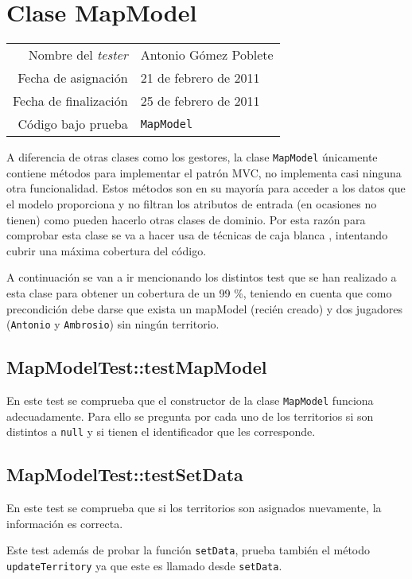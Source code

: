 \section{Clase MapModel}

{\small
\begin{tabular}{r|l}
Nombre del \textit{tester} & Antonio Gómez Poblete \\
Fecha de asignación & 21 de febrero de 2011 \\
Fecha de finalización & 25 de febrero de 2011 \\
Código bajo prueba & \texttt{MapModel}
\end{tabular}
}

A diferencia de otras clases como los gestores, la clase \texttt{MapModel} únicamente contiene métodos para implementar el patrón MVC, no  implementa casi ninguna otra funcionalidad. Estos métodos son en su mayoría para acceder a los datos que el modelo proporciona y no filtran los atributos de entrada (en ocasiones no tienen) como pueden hacerlo otras clases de dominio. Por esta razón para comprobar esta clase se va a hacer usa de técnicas de caja blanca , intentando cubrir una máxima cobertura del código.  

A continuación se van a ir mencionando los distintos test que se han realizado a esta clase para obtener un cobertura de un 99 \%, teniendo en cuenta que como precondición debe darse que exista un mapModel (recién creado) y dos jugadores (\texttt{Antonio} y \texttt{Ambrosio}) sin ningún territorio.  


\subsection{MapModelTest::testMapModel} 

En este test se comprueba que el constructor de la clase \texttt{MapModel} funciona adecuadamente. Para ello se pregunta por cada uno de los territorios si  son distintos a \texttt{null} y si tienen el identificador que les corresponde.

\subsection {MapModelTest::testSetData}

En este test se comprueba que si los territorios son asignados nuevamente, la información es correcta.

Este test además de probar la función \texttt{setData}, prueba también el método \texttt{updateTerritory} ya que este es llamado desde \texttt{setData}.

